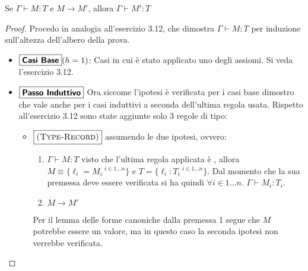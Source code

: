 	Se $\Gamma \vdash M : T$ e $M \longrightarrow M'$, allora
	$\Gamma \vdash M':T$

\begin{proof}
Procedo in analogia all'esercizio 3.12, che dimostra $\Gamma \vdash M : T$ per
induzione sull'altezza dell'albero della prova.
\begin{itemize}
	\item $\boxed{\text{\textbf{Casi Base}}} (h = 1)$: Casi in cui \`e stato applicato uno degli assiomi. Si veda
	l'esercizio 3.12.
	\item $\boxed{\text{\textbf{Passo Induttivo}}}$ Ora siccome l'ipotesi \`e verificata
	per i casi base dimostro che vale anche per i casi induttivi a seconda dell'ultima regola usata. 
	Rispetto all'esercizio 3.12 sono state aggiunte solo
	3 regole di tipo:
	\begin{itemize}
		\item $\boxed{\textsc{(Type-Record)}}$ assumendo le due ipotesi, ovvero:
		\begin{enumerate}
			\item $\Gamma \vdash M : T$ visto che l'ultima regola applicata \`e
			 , allora
			 $M \equiv \{\ell_i = M_i\ ^{i \in 1 \dots n} \}$ e
			 $T = \{\ell_i : T_i\ ^{i \in 1 \dots n}\}$. Dal momento che la sua
			 premessa deve essere verificata si ha quindi
			 $\forall i \in 1 \dots n$. $\Gamma \vdash M_i : T_i$.
			
			\item $M \longrightarrow M'$
		\end{enumerate}
		
		Per il lemma delle forme canoniche dalla premessa 1 segue che $M$ potrebbe essere un valore, ma in questo caso
		la seconda ipotesi non verrebbe verificata.
		

\end{itemize}
\end{itemize}
\end{proof}
